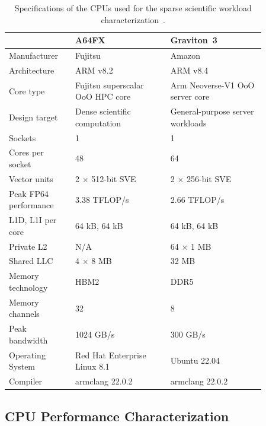 \begin{table}
    \centering
    \footnotesize
    \caption[Specifications of the CPUs used for sparse scientific workloads.]{Specifications of the CPUs used for the sparse scientific workload characterization~\cite{sgherzi2024jpdc,sato2020design,aws2026graviton}.}
    \vspace{-0.5em}
    \begin{tabular}{p{0.22\linewidth}p{0.32\linewidth}p{0.32\linewidth}}
        \toprule
        & \textbf{A64FX} & \textbf{Graviton~3} \\
        \midrule
        Manufacturer & Fujitsu & Amazon \\
        Architecture & ARM v8.2 & ARM v8.4 \\
        Core type & Fujitsu superscalar OoO HPC core & Arm Neoverse-V1 OoO server core \\
        Design target & Dense scientific computation & General-purpose server workloads \\
        Sockets & 1 & 1 \\
        Cores per socket & 48 & 64 \\
        Vector units & 2 $\times$ 512-bit SVE & 2 $\times$ 256-bit SVE \\
        Peak FP64 performance & 3.38 TFLOP/s & 2.66 TFLOP/s \\
        L1D, L1I per core & 64 kB, 64 kB & 64 kB, 64 kB \\
        Private L2 & N/A & 64 $\times$ 1 MB \\
        Shared LLC & 4 $\times$ 8 MB & 32 MB \\
        Memory technology & HBM2 & DDR5 \\
        Memory channels & 32 & 8 \\
        Peak bandwidth & 1024 GB/s & 300 GB/s \\
        Operating System & Red Hat Enterprise Linux 8.1 & Ubuntu 22.04 \\
        Compiler & armclang 22.0.2 & armclang 22.0.2 \\
        \bottomrule
    \end{tabular}
    \label{tab:implications-scientific-cpu-specs}
\end{table}

\subsection{CPU Performance Characterization} \label{sec:scientific-cpu-performance-characterization} %

